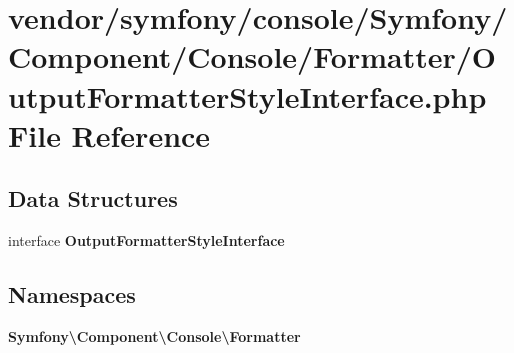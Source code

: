 \section{vendor/symfony/console/\+Symfony/\+Component/\+Console/\+Formatter/\+Output\+Formatter\+Style\+Interface.php File Reference}
\label{_output_formatter_style_interface_8php}
\subsection*{Data Structures}
\begin{DoxyCompactItemize}
\item 
interface {\bf Output\+Formatter\+Style\+Interface}
\end{DoxyCompactItemize}
\subsection*{Namespaces}
\begin{DoxyCompactItemize}
\item 
 {\bf Symfony\textbackslash{}\+Component\textbackslash{}\+Console\textbackslash{}\+Formatter}
\end{DoxyCompactItemize}

